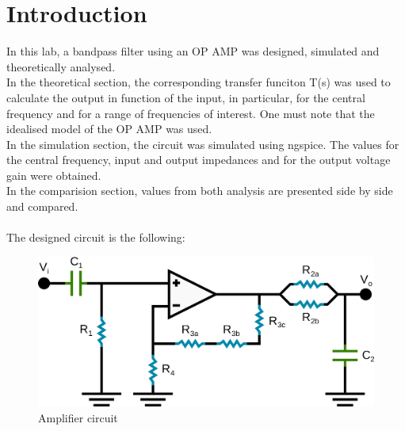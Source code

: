 \section{Introduction}
\label{sec:intro}
In this lab, a bandpass filter using an OP AMP was designed, simulated and theoretically analysed.\\
 In the theoretical section, the corresponding transfer funciton T(s) was used to calculate the output in function of the input, in particular, for the central frequency and for a range of frequencies of interest. One must note that the idealised model of the OP AMP was used. \\
 In the simulation section, the circuit was simulated using ngspice. The values for the central frequency, input and output impedances and for the output voltage gain were obtained.\\
In the comparision section, values from both analysis are presented side by side and compared.\\ \\
The designed circuit is the following:


\begin{figure} [!htb] 
  \includegraphics[width=\linewidth]{circuit.png}
  \caption{Amplifier circuit}
  \label{fig:theoplots}
  \endminipage\hfill
\end{figure}


\FloatBarrier
